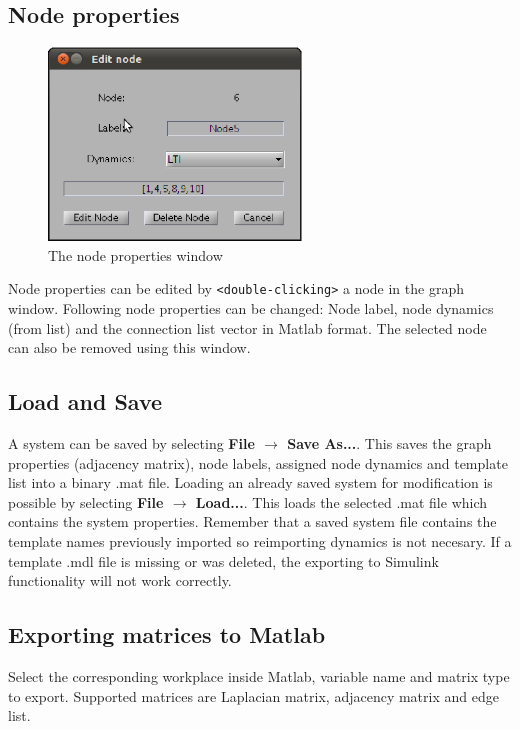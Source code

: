 \documentclass[a4paper,twoside, openright,12pt]{report}
\begin{document}
\subsection{Node properties}\label{node_properties}
\begin{figure}[h!]
 \centering
 \includegraphics[width=0.6\textwidth]{./pics/Edit_node.eps}
 \caption{The node properties window}
 \label{fig:Edit_Node}
\end{figure}
Node properties can be edited by \verb|<double-clicking>| a node in the graph window. 
Following node properties can be changed: Node label, node dynamics (from list) and the connection list vector in Matlab format.
The selected node can also be removed using this window.                         

\subsection{Load and Save}
A system can be saved by selecting \textbf{File $\rightarrow$ Save As...}. This saves the graph properties (adjacency matrix), node labels, assigned node dynamics and template list into a binary .mat file.
Loading an already saved system for modification is possible by selecting \textbf{File $\rightarrow$ Load...}. This loads the selected .mat file which contains the system properties. \linebreak
Remember that a saved system file contains the template names previously imported so reimporting dynamics is not necesary.
If a template .mdl file is missing or was deleted, the exporting to Simulink functionality will not work correctly.

\subsection{Exporting matrices to Matlab}
Select the corresponding workplace inside Matlab, variable name and matrix type to export.
Supported matrices are Laplacian matrix, adjacency matrix and edge list.
\end{document}
